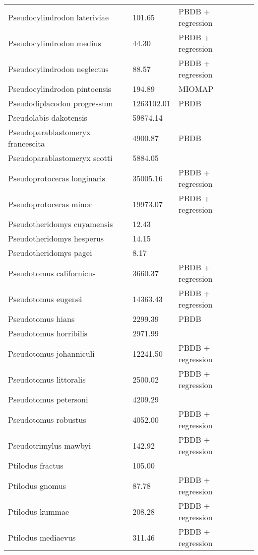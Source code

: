 \documentclass{article}
\begin{document}
\begin{center}
\begin{longtable}{p{} p{} p{} p{}}
    Pseudocylindrodon lateriviae & 101.65 & PBDB + regression &  \\ 
    Pseudocylindrodon medius & 44.30 & PBDB + regression &  \\ 
    Pseudocylindrodon neglectus & 88.57 & PBDB + regression &  \\ 
    Pseudocylindrodon pintoensis & 194.89 & MIOMAP &  \\ 
    Pseudodiplacodon progressum & 1263102.01 & PBDB &  \\ 
    Pseudolabis dakotensis & 59874.14 & \cite{Tomiya2013} &  \\ 
    Pseudoparablastomeryx francescita & 4900.87 & PBDB &  \\ 
    Pseudoparablastomeryx scotti & 5884.05 & \cite{Tomiya2013} &  \\ 
    Pseudoprotoceras longinaris & 35005.16 & PBDB + regression &  \\ 
    Pseudoprotoceras minor & 19973.07 & PBDB + regression &  \\ 
    Pseudotheridomys cuyamensis & 12.43 & \cite{Tomiya2013} &  \\ 
    Pseudotheridomys hesperus & 14.15 & \cite{Tomiya2013} &  \\ 
    Pseudotheridomys pagei & 8.17 & \cite{Tomiya2013} &  \\ 
    Pseudotomus californicus & 3660.37 & PBDB + regression &  \\ 
    Pseudotomus eugenei & 14363.43 & PBDB + regression &  \\ 
    Pseudotomus hians & 2299.39 & PBDB &  \\ 
    Pseudotomus horribilis & 2971.99 & \cite{Carraway2010} &  \\ 
    Pseudotomus johanniculi & 12241.50 & PBDB + regression &  \\ 
    Pseudotomus littoralis & 2500.02 & PBDB + regression &  \\ 
    Pseudotomus petersoni & 4209.29 & \cite{Carraway2010} &  \\ 
    Pseudotomus robustus & 4052.00 & PBDB + regression &  \\ 
    Pseudotrimylus mawbyi & 142.92 & PBDB + regression &  \\ 
    Ptilodus fractus & 105.00 & \cite{Wilson2012} &  \\ 
    Ptilodus gnomus & 87.78 & PBDB + regression &  \\ 
    Ptilodus kummae & 208.28 & PBDB + regression &  \\ 
    Ptilodus mediaevus & 311.46 & PBDB + regression &  \\ 

\end{longtable}
\end{center}
\end{document}
